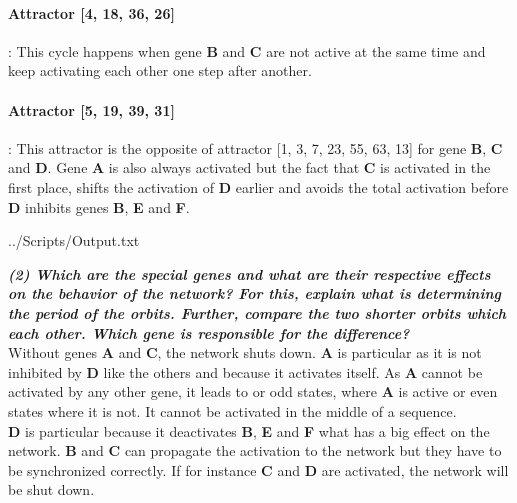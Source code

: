 \documentclass[10pt,a4paper]{article}
\begin{document}
\begin{enumerate}
\paragraph{Attractor {[}4, 18, 36, 26{]}}: This cycle happens when gene \textbf{B} and \textbf{C} are not active at the same time and keep activating each other one step after another. 

\paragraph{Attractor {[}5, 19, 39, 31{]}}: This attractor is the opposite of attractor {[}1, 3, 7, 23, 55, 63, 13{]} for gene \textbf{B}, \textbf{C} and \textbf{D}. Gene \textbf{A} is also always activated but the fact that \textbf{C} is activated in the first place, shifts the activation of \textbf{D} earlier and avoids the total activation before \textbf{D} inhibits genes \textbf{B}, \textbf{E} and \textbf{F}. 



\newpage
 {../Scripts/Output.txt}


\textbf{\textit{(2) Which are the special genes and what are their respective effects on the behavior of the
		network? For this, explain what is determining the period of the orbits. Further, compare
		the two shorter orbits which each other. Which gene is responsible for the difference?}}\\
	
	Without genes \textbf{A} and \textbf{C}, the network shuts down. \textbf{A} is particular as it is not inhibited by \textbf{D} like the others and because it activates itself. As \textbf{A} cannot be activated by any other gene, it leads to or odd states, where \textbf{A} is active or even states where it is not. It cannot be activated in the middle of a sequence. \\
	
	
	\textbf{D} is particular because it deactivates \textbf{B}, \textbf{E} and \textbf{F} what has a big effect on the network. \textbf{B} and \textbf{C} can propagate the activation to the network but they have to be synchronized correctly. If for instance \textbf{C} and \textbf{D} are activated, the network will be shut down. 
	
	



\end{enumerate}
\end{document}
